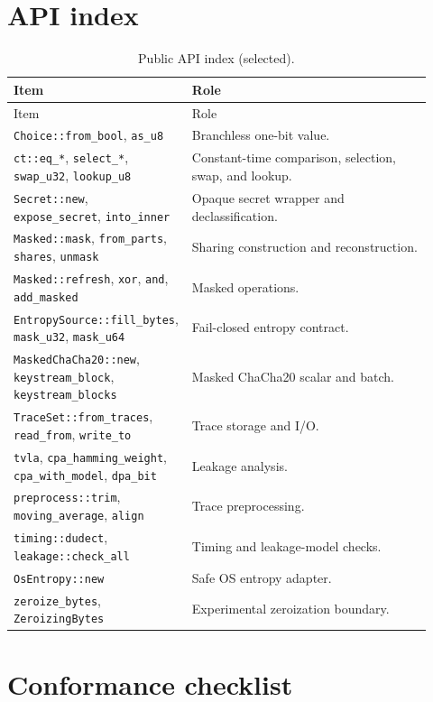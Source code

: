\documentclass[11pt,a4paper]{article}
\newcommand{\code}[1]{\texttt{#1}}
\theoremstyle{plain}
\theoremstyle{definition}
\theoremstyle{remark}
\begin{document}
\section{API index}

\begin{longtable}{@{}p{0.34\linewidth}p{0.58\linewidth}@{}}
\caption{Public API index (selected).}\label{tab:api}\\
\toprule
Item & Role \\
\midrule
\endfirsthead
\toprule
Item & Role \\
\midrule
\endhead
\code{Choice::from\_bool}, \code{as\_u8} & Branchless one-bit value. \\
\code{ct::eq\_*}, \code{select\_*}, \code{swap\_u32}, \code{lookup\_u8} &
Constant-time comparison, selection, swap, and lookup. \\
\code{Secret::new}, \code{expose\_secret}, \code{into\_inner} &
Opaque secret wrapper and declassification. \\
\code{Masked::mask}, \code{from\_parts}, \code{shares}, \code{unmask} &
Sharing construction and reconstruction. \\
\code{Masked::refresh}, \code{xor}, \code{and}, \code{add\_masked} &
Masked operations. \\
\code{EntropySource::fill\_bytes}, \code{mask\_u32}, \code{mask\_u64} &
Fail-closed entropy contract. \\
\code{MaskedChaCha20::new}, \code{keystream\_block}, \code{keystream\_blocks} &
Masked ChaCha20 scalar and batch. \\
\code{TraceSet::from\_traces}, \code{read\_from}, \code{write\_to} &
Trace storage and I/O. \\
\code{tvla}, \code{cpa\_hamming\_weight}, \code{cpa\_with\_model}, \code{dpa\_bit} &
Leakage analysis. \\
\code{preprocess::trim}, \code{moving\_average}, \code{align} &
Trace preprocessing. \\
\code{timing::dudect}, \code{leakage::check\_all} &
Timing and leakage-model checks. \\
\code{OsEntropy::new} & Safe OS entropy adapter. \\
\code{zeroize\_bytes}, \code{ZeroizingBytes} & Experimental zeroization boundary. \\
\bottomrule
\end{longtable}

\section{Conformance checklist}
\end{document}
